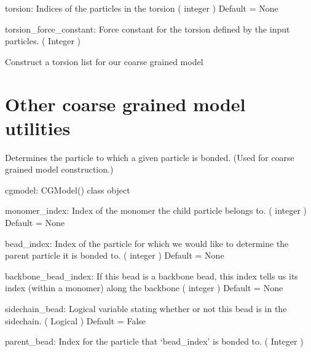 \documentclass[letterpaper,12pt,english,openany,oneside]{sphinxmanual}
\begin{document}
\begin{fulllineitems}
\begin{fulllineitems}
torsion: Indices of the particles in the torsion
( integer )
Default = None

torsion\_force\_constant: Force constant for the torsion defined by the input particles.
( Integer )

\end{fulllineitems}


\begin{fulllineitems}
\label{\detokenize{cg_model:cg_model.cgmodel.CGModel.get_torsion_list}}
Construct a torsion list for our coarse grained model

\end{fulllineitems}


\end{fulllineitems}



\section{Other coarse grained model utilities}
\label{\detokenize{cg_model:module-cg_model.cgmodel}}\label{\detokenize{cg_model:other-coarse-grained-model-utilities}}

\begin{fulllineitems}
\label{\detokenize{cg_model:cg_model.cgmodel.get_parent_bead}}
Determines the particle to which a given particle is bonded.  (Used for coarse grained model construction.)

cgmodel: CGModel() class object

monomer\_index: Index of the monomer the child particle belongs to.
( integer )
Default = None

bead\_index: Index of the particle for which we would like to determine the parent particle it is bonded to.
( integer )
Default = None

backbone\_bead\_index: If this bead is a backbone bead, this index tells us its index (within a monomer) along the backbone
( integer )
Default = None

sidechain\_bead: Logical variable stating whether or not this bead is in the sidechain.
( Logical )
Default = False

parent\_bead: Index for the particle that ‘bead\_index’ is bonded to.
( Integer )

\end{fulllineitems}
\end{document}
